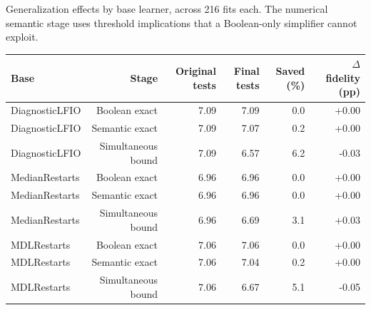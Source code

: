 \begin{kbtable}
\centering
\caption{Generalization effects by base learner, across 216 fits each. The numerical semantic stage uses threshold implications that a Boolean-only simplifier cannot exploit.}
\label{tab:generalization-base}
\small
\begin{adjustbox}{max width=\linewidth}
\begin{tabular}{lrrrrr}
\toprule
Base & Stage & Original tests & Final tests & Saved (\%) & $\Delta$ fidelity (pp) \\
\midrule
DiagnosticLFIO & Boolean exact & 7.09 & 7.09 & 0.0 & +0.00 \\
DiagnosticLFIO & Semantic exact & 7.09 & 7.07 & 0.2 & +0.00 \\
DiagnosticLFIO & Simultaneous bound & 7.09 & 6.57 & 6.2 & -0.03 \\
MedianRestarts & Boolean exact & 6.96 & 6.96 & 0.0 & +0.00 \\
MedianRestarts & Semantic exact & 6.96 & 6.96 & 0.0 & +0.00 \\
MedianRestarts & Simultaneous bound & 6.96 & 6.69 & 3.1 & +0.03 \\
MDLRestarts & Boolean exact & 7.06 & 7.06 & 0.0 & +0.00 \\
MDLRestarts & Semantic exact & 7.06 & 7.04 & 0.2 & +0.00 \\
MDLRestarts & Simultaneous bound & 7.06 & 6.67 & 5.1 & -0.05 \\
\bottomrule
\end{tabular}
\end{adjustbox}
\end{kbtable}
